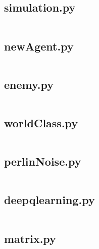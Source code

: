 \begin{flushleft}
        \label{sec:simulation.py}
        \subsection{simulation.py}
        \inputminted[frame=leftline,framesep=2mm,baselinestretch=1.2,fontsize=\normalsize,linenos,breaklines]{python}{../Scripts/simulation.py}

        \label{sec:newAgent.py}
        \subsection{newAgent.py}
        \inputminted[frame=leftline,framesep=2mm,baselinestretch=1.2,fontsize=\normalsize,linenos,breaklines]{python}{../Scripts/newAgent.py}

        \label{sec:enemy.py}
        \subsection{enemy.py}
        \inputminted[frame=leftline,framesep=2mm,baselinestretch=1.2,fontsize=\normalsize,linenos,breaklines]{python}{../Scripts/enemy.py}

        \label{sec:worldClass.py}
        \subsection{worldClass.py}
        \inputminted[frame=leftline,framesep=2mm,baselinestretch=1.2,fontsize=\normalsize,linenos,breaklines]{python}{../Scripts/worldClass.py}

        \label{sec:perlinNoise.py}
        \subsection{perlinNoise.py}
        \inputminted[frame=leftline,framesep=2mm,baselinestretch=1.2,fontsize=\normalsize,linenos,breaklines]{python}{../Scripts/perlinNoise.py}

        \label{sec:deepqlearning.py}
        \subsection{deepqlearning.py}
        \inputminted[frame=leftline,framesep=2mm,baselinestretch=1.2,fontsize=\normalsize,linenos,breaklines]{python}{../Scripts/deepqlearning.py}

        \label{sec:matrix.py}
        \subsection{matrix.py}
        \inputminted[frame=leftline,framesep=2mm,baselinestretch=1.2,fontsize=\normalsize,linenos,breaklines]{python}{../Scripts/matrix.py}


\end{flushleft}
